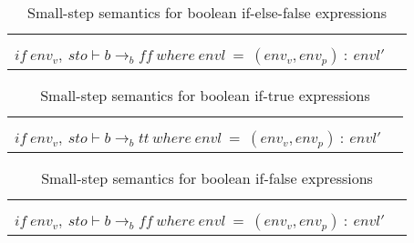 \begin{table}[H]
    \centering
    \begin{longtable}[c] { r c }
    
    \begin{tabular}{@{}c@{}} 
    [IF-ELSE-FALSE] \\
    \newline
    \end{tabular}
  \begin{tabular}{@{}c@{}}   \(
  \langle if \ {b} \ then \ {S_1} \ else \ {S_2} \ sto, envl\rangle \Rightarrow \langle{S_2},sto,envl\rangle
  \)  \\ \(
  if \ env_v, \ sto \vdash b \rightarrow_b {ff} \ where \ envl \ = \ (env_v, env_p) \ : \ envl' 
  \) 
  \end{tabular}
        
 \end{longtable}
    \caption{Small-step semantics for boolean if-else-false expressions}\label{sem:if-else-false}
\end{table}

\begin{table}[H]
    \centering
    \begin{longtable}[c] { r c }
    
    \begin{tabular}{@{}c@{}} 
    [IF-TRUE] \\
    \newline
    \end{tabular}
  \begin{tabular}{@{}c@{}}   \(
  \langle if \ {b} \ then \ {S_1} \ sto, envl\rangle \Rightarrow \langle{S_1},sto,envl\rangle
  \)  \\ \(
  if \ env_v, \ sto \vdash b \rightarrow_b {tt} \ where \ envl \ = \ (env_v, env_p) \ : \ envl' 
  \) 
  \end{tabular}
        
 \end{longtable}
    \caption{Small-step semantics for boolean if-true expressions}\label{sem:if-true}
\end{table}

\begin{table}[H]
    \centering
    \begin{longtable}[c] { r c }
    
    \begin{tabular}{@{}c@{}} 
    [IF-FALSE] \\
    \newline
    \end{tabular}
  \begin{tabular}{@{}c@{}}   \(
  \langle if \ {b} \ then \ {S_1} \ sto, envl\rangle \Rightarrow \langle{S_2},sto,envl\rangle
  \)  \\ \(
  if \ env_v, \ sto \vdash b \rightarrow_b {ff} \ where \ envl \ = \ (env_v, env_p) \ : \ envl' 
  \) 
  \end{tabular}
        
 \end{longtable}
    \caption{Small-step semantics for boolean if-false expressions}\label{sem:if-false}
\end{table}

